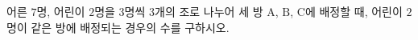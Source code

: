 \hspace*{2mm}\begin{minipage}[t]{\dimexpr\linewidth-2mm\relax}\vspace{0pt}
어른 $7$명, 어린이 $2$명을 $3$명씩 $3$개의 조로 나누어 세 방 $\mathrm{A}$, $\mathrm{B}$, $\mathrm{C}$에 배정할 때, 어린이 $2$명이 같은 방에 배정되는 경우의 수를 구하시오.\end{minipage}
